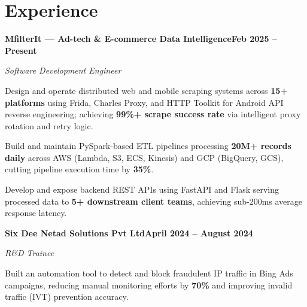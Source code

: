 \documentclass[letterpaper,9pt]{article}
\newcommand{\heading}[2]{
  \hspace{10pt}#1\hfill#2\\
}
\newcommand{\headingBf}[2]{
  \heading{\textbf{#1}}{\textbf{#2}}
}
\newcommand{\headingIt}[2]{
  \heading{\textit{#1}}{\textit{#2}}
}
\newenvironment{resume_list}{
  \vspace{-5pt}
  \begin{itemize}[itemsep=0px, parsep=1pt, leftmargin=30pt]
}{
  \end{itemize}
  \vspace{-4pt}
}
\begin{document}

  \section{Experience}
\vspace{-0.4em}

  \headingBf{MfilterIt {\normalfont\small--- Ad-tech \& E-commerce Data Intelligence}}{Feb 2025 -- Present}
    \vspace{-0.2em}
  \headingIt{Software Development Engineer}{}
  \vspace{-0.2em}
  \begin{resume_list}
    \item Design and operate distributed web and mobile scraping systems across \textbf{15+ platforms} using Frida, Charles Proxy, and HTTP Toolkit for Android API reverse engineering; achieving \textbf{99\%+ scrape success rate} via intelligent proxy rotation and retry logic.
    \item Build and maintain PySpark-based ETL pipelines processing \textbf{20M+ records daily} across AWS (Lambda, S3, ECS, Kinesis) and GCP (BigQuery, GCS), cutting pipeline execution time by \textbf{35\%}.
    \item Develop and expose backend REST APIs using FastAPI and Flask serving processed data to \textbf{5+ downstream client teams}, achieving sub-200ms average response latency.
  \end{resume_list}
\vspace{-0.2em}
  \headingBf{Six Dee Netad Solutions Pvt Ltd}{April 2024 -- August 2024}
    \vspace{-0.2em}
  \headingIt{R\&D Trainee}{}
  \vspace{-0.2em}
  \begin{resume_list}
    \item Built an automation tool to detect and block fraudulent IP traffic in Bing Ads campaigns, reducing manual monitoring efforts by \textbf{70\%} and improving invalid traffic (IVT) prevention accuracy.
  \end{resume_list}
\vspace{-0.2em}
\end{document}
